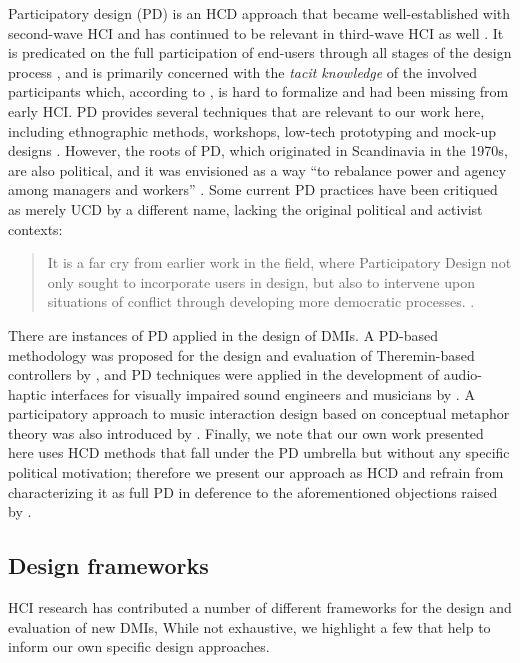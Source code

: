 \documentclass[Sullivan_phd_thesis.tex]{subfiles}
\begin{document}
Participatory design (PD) is an HCD approach that became well-established with second-wave HCI \parencite{Bodker2015} and has continued to be relevant in third-wave HCI as well \parencite{Muller2012}. It is predicated on the full participation of end-users through all stages of the design process \parencite{Steen2011}, and is primarily concerned with the \emph{tacit knowledge} of the involved participants which, according to \textcite{Spinuzzi2005}, is hard to formalize and had been missing from early HCI. PD provides several techniques that are relevant to our work here, including ethnographic methods, workshops, low-tech prototyping and mock-up designs \parencite{Muller1993a}. However, the roots of PD, which originated in Scandinavia in the 1970s, are also political, and it was envisioned as a way ``to rebalance power and agency among managers and workers'' \parencite[p. 1]{Bannon2018}. Some current PD practices have been critiqued as merely UCD by a different name, lacking the original political and activist contexts: 

\begin{quote}
    It is a far cry from earlier work in the field, where Participatory Design not only sought to incorporate users in design, but also to intervene upon situations of conflict through developing more democratic processes. \parencite[p. 2]{Bannon2018}. 
\end{quote}

There are instances of PD applied in the design of DMIs. A PD-based methodology was proposed for the design and evaluation of Theremin-based controllers by \textcite{Geiger2008}, and PD techniques were applied in the development of audio-haptic interfaces for visually impaired sound engineers and musicians by \textcite{Metatla2016}. A participatory approach to music interaction design based on conceptual metaphor theory was also introduced by \textcite{wilkie2013towards}. Finally, we note that our own work presented here uses HCD methods that fall under the PD umbrella but without any specific political motivation; therefore we present our approach as HCD and refrain from characterizing it as full PD in deference to the aforementioned objections raised by \citeauthor{Bannon2018}. 

\subsection{Design frameworks}
\label{ch3-sec:design-frameworks}

HCI research has contributed a number of different frameworks for the design and evaluation of new DMIs, While not exhaustive, we highlight a few that help to inform our own specific design approaches. 
\end{document}
